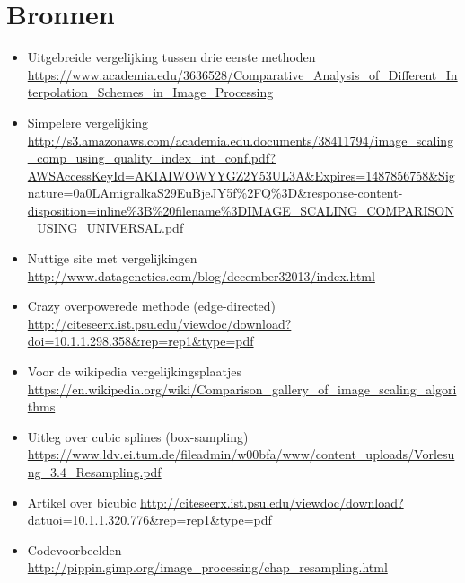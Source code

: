 \documentclass[a4paper]{article}
\begin{document}
\section{Bronnen}
\label{sec:org9746756}
\begin{itemize}
\item Uitgebreide vergelijking tussen drie eerste methoden \url{https://www.academia.edu/3636528/Comparative\_Analysis\_of\_Different\_Interpolation\_Schemes\_in\_Image\_Processing}
\item Simpelere vergelijking \url{http://s3.amazonaws.com/academia.edu.documents/38411794/image\_scaling\_comp\_using\_quality\_index\_int\_conf.pdf?AWSAccessKeyId=AKIAIWOWYYGZ2Y53UL3A\&Expires=1487856758\&Signature=0a0LAmigralkaS29EuBjeJY5f\%2FQ\%3D\&response-content-disposition=inline\%3B\%20filename\%3DIMAGE\_SCALING\_COMPARISON\_USING\_UNIVERSAL.pdf}
\item Nuttige site met vergelijkingen \url{http://www.datagenetics.com/blog/december32013/index.html}
\item Crazy overpowerede methode (edge-directed) \url{http://citeseerx.ist.psu.edu/viewdoc/download?doi=10.1.1.298.358\&rep=rep1\&type=pdf}
\item Voor de wikipedia vergelijkingsplaatjes \url{https://en.wikipedia.org/wiki/Comparison\_gallery\_of\_image\_scaling\_algorithms}
\item Uitleg over cubic splines (box-sampling) \url{https://www.ldv.ei.tum.de/fileadmin/w00bfa/www/content\_uploads/Vorlesung\_3.4\_Resampling.pdf}
\item Artikel over bicubic \url{http://citeseerx.ist.psu.edu/viewdoc/download?datuoi=10.1.1.320.776\&rep=rep1\&type=pdf}
\item Codevoorbeelden \url{http://pippin.gimp.org/image\_processing/chap\_resampling.html}
\end{itemize}
\end{document}
